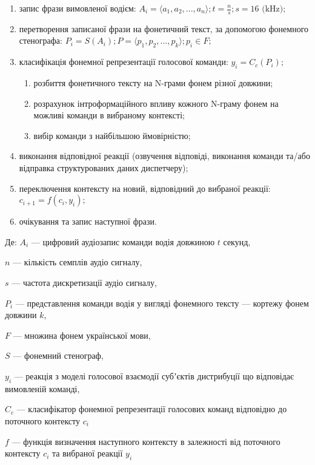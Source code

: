 \begin{enumerate}
	\item запис фрази вимовленої водієм: $A_i=\langle a_1,a_2,...,a_n\rangle; t=\frac{n}{s}; s=16 \text{ (kHz)};$
	\item перетворення записаної фрази на фонетичний текст, за допомогою фонемного стенографа: $P_i=S(A_i); P=\langle p_1,p_2,...,p_k\rangle; p_i \in F;$
	\item класифікація фонемної репрезентації голосової команди: $y_i=C_c(P_i);$
	\begin{enumerate}
		\item розбиття фонетичного тексту на N-грами фонем різної довжини;
		\item розрахунок інтроформаційного впливу кожного N-граму фонем на можливі команди в вибраному контексті;
		\item вибір команди з найбільшою ймовірністю;
	\end{enumerate}
	\item виконання відповідної реакції (озвучення відповіді, виконання команди та/або відправка структурованих даних диспетчеру);
	\item переключення контексту на новий, відповідний до вибраної реакції: $c_{i+1} = f(c_i, y_i);$
	\item очікування та запис наступної фрази.
\end{enumerate}


Де: $A_i$ --- цифровий аудіозапис команди водія довжиною $t$ секунд,

{\settowidth{\leftskip}{Де:\ }
	
	$n$ --- кількість семплів аудіо сигналу,
	
	$s$ --- частота дискретизації аудіо сигналу,
	
	$P_i$ --- представлення команди водія у вигляді фонемного тексту --- кортежу фонем довжини $k$,
	
	$F$ --- множина фонем української мови,
	
	$S$ --- фонемний стенограф,
	
	$y_i$ --- реакція з моделі голосової взаємодії субʼєктів дистрибуції що відповідає вимовленій команді,
	
	$C_c$ --- класифікатор фонемної репрезентації голосових команд відповідно до поточного контексту $c_i$
	
	$f$ --- функція визначення наступного контексту в залежності від поточного контексту $c_i$ та вибраної реакції $y_i$
	
}

